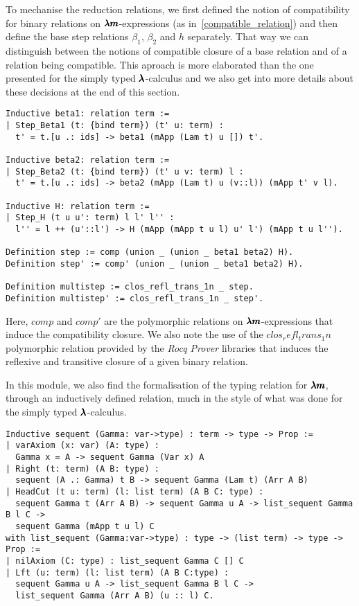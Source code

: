 To mechanise the reduction relations, we first defined the notion of compatibility for binary relations on $\pmb{\lambda m}$-expressions (as in~\cref{compatible_relation}) and then define the base step relations $\beta_1$, $\beta_2$ and $h$ separately.
That way we can distinguish between the notions of compatible closure of a base relation and of a relation being compatible.
This aproach is more elaborated than the one presented for the simply typed $\pmb{\lambda}$-calculus and we also get into more details about these decisions at the end of this section.

\begin{lstlisting}[language=Coq]
Inductive beta1: relation term :=
| Step_Beta1 (t: {bind term}) (t' u: term) :
  t' = t.[u .: ids] -> beta1 (mApp (Lam t) u []) t'.

Inductive beta2: relation term :=
| Step_Beta2 (t: {bind term}) (t' u v: term) l :
  t' = t.[u .: ids] -> beta2 (mApp (Lam t) u (v::l)) (mApp t' v l).

Inductive H: relation term :=       
| Step_H (t u u': term) l l' l'' :
  l'' = l ++ (u'::l') -> H (mApp (mApp t u l) u' l') (mApp t u l'').

Definition step := comp (union _ (union _ beta1 beta2) H).
Definition step' := comp' (union _ (union _ beta1 beta2) H).

Definition multistep := clos_refl_trans_1n _ step.
Definition multistep' := clos_refl_trans_1n _ step'.
\end{lstlisting}

Here, \lst$comp$ and \lst$comp'$ are the polymorphic relations on $\pmb{\lambda m}$-expressions that induce the compatibility closure.
We also note the use of the \lst$clos_refl_trans_1n$ polymorphic relation provided by the \textit{Rocq Prover} libraries that induces the reflexive and transitive closure of a given binary relation.

In this module, we also find the formalisation of the typing relation for $\pmb{\lambda m}$, through an inductively defined relation, much in the style of what was done for the simply typed $\pmb{\lambda}$-calculus.
\begin{lstlisting}[language=Coq]
Inductive sequent (Gamma: var->type) : term -> type -> Prop := 
| varAxiom (x: var) (A: type) :
  Gamma x = A -> sequent Gamma (Var x) A
| Right (t: term) (A B: type) :
  sequent (A .: Gamma) t B -> sequent Gamma (Lam t) (Arr A B)
| HeadCut (t u: term) (l: list term) (A B C: type) :
  sequent Gamma t (Arr A B) -> sequent Gamma u A -> list_sequent Gamma B l C ->
  sequent Gamma (mApp t u l) C
with list_sequent (Gamma:var->type) : type -> (list term) -> type -> Prop :=
| nilAxiom (C: type) : list_sequent Gamma C [] C
| Lft (u: term) (l: list term) (A B C:type) :
  sequent Gamma u A -> list_sequent Gamma B l C ->
  list_sequent Gamma (Arr A B) (u :: l) C.
\end{lstlisting}

